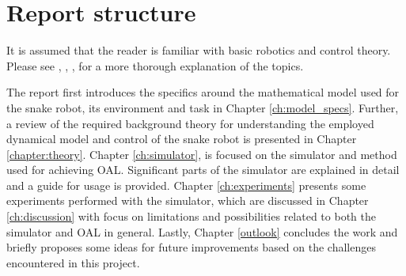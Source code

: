 \section{Report structure}
It is assumed that the reader is familiar with basic robotics and control theory. Please see \cite{lynch2017modern}, \cite{lynch2017modernCompTorque}, \cite{waldron2016kinematics}, \cite{liljeback2012snake} for a more thorough explanation of the topics.

The report first introduces the specifics around the mathematical model used for the snake robot, its environment and task in Chapter \ref{ch:model_specs}. Further, a review of the required background theory for understanding the employed dynamical model and control of the snake robot is presented in Chapter \ref{chapter:theory}. Chapter \ref{ch:simulator}, is focused on the simulator and method used for achieving OAL. Significant parts of the simulator are explained in detail and a guide for usage is provided. Chapter \ref{ch:experiments} presents some experiments performed with the simulator, which are discussed in Chapter \ref{ch:discussion} with focus on limitations and possibilities related to both the simulator and OAL in general. Lastly, Chapter \ref{outlook} concludes the work and briefly proposes some ideas for future improvements based on the challenges encountered in this project.